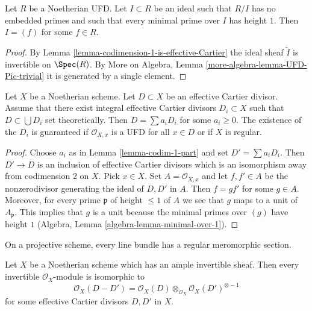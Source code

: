 \begin{lemma}
\label{lemma-UFD-one-equation-CM}
Let $R$ be a Noetherian UFD. Let $I \subset R$ be an ideal
such that $R/I$ has no embedded primes and such that
every minimal prime over $I$ has height $1$.
Then $I = (f)$ for some $f \in R$.
\end{lemma}

\begin{proof}
By Lemma \ref{lemma-codimension-1-is-effective-Cartier}
the ideal sheaf $\tilde I$ is invertible on $\Spec(R)$.
By More on Algebra, Lemma \ref{more-algebra-lemma-UFD-Pic-trivial}
it is generated by a single element.
\end{proof}

\begin{lemma}
\label{lemma-effective-Cartier-divisor-is-a-sum}
Let $X$ be a Noetherian scheme. Let $D \subset X$ be an effective
Cartier divisor. Assume that there exist integral effective Cartier
divisors $D_i \subset X$ such that $D \subset \bigcup D_i$
set theoretically. Then $D = \sum a_i D_i$ for some $a_i \geq 0$.
The existence of the $D_i$ is guaranteed if $\mathcal{O}_{X, x}$
is a UFD for all $x \in D$ or if $X$ is regular.
\end{lemma}

\begin{proof}
Choose $a_i$ as in Lemma \ref{lemma-codim-1-part} and set $D' = \sum a_i D_i$.
Then $D' \to D$ is an inclusion of effective Cartier divisors which
is an isomorphism away from codimension $2$ on $X$. Pick $x \in X$.
Set $A = \mathcal{O}_{X, x}$ and let $f, f' \in A$ be the nonzerodivisor
generating the ideal of $D, D'$ in $A$. Then $f = gf'$ for some $g \in A$.
Moreover, for every prime $\mathfrak p$ of height $\leq 1$ of $A$ we see
that $g$ maps to a unit of $A_\mathfrak p$. This implies that $g$ is
a unit because the minimal primes over $(g)$ have height $1$
(Algebra, Lemma \ref{algebra-lemma-minimal-over-1}).
\end{proof}

\begin{lemma}
\label{lemma-quasi-projective-Noetherian-pic-effective-Cartier}
\begin{slogan}
On a projective scheme, every line bundle has a regular meromorphic section.
\end{slogan}
Let $X$ be a Noetherian scheme which has an ample invertible sheaf.
Then every invertible $\mathcal{O}_X$-module is isomorphic to
$$
\mathcal{O}_X(D - D') =
\mathcal{O}_X(D) \otimes_{\mathcal{O}_X} \mathcal{O}_X(D')^{\otimes -1}
$$
for some effective Cartier divisors $D, D'$ in $X$.
\end{lemma}

